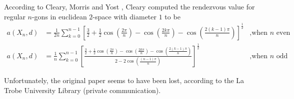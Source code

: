 
According to Cleary, Morris and Yost \cite{cleary:numbers-of-shapes}, Cleary computed the rendezvous value for regular $n$-gons in euclidean $2$-space with diameter $1$ to be 
	\begin{align*}
	a(X_n,d)&=\frac{1}{2n}\sum_{k=0}^{n-1}\left[\frac{3}{2}+\frac{1}{2}\cos\left(\frac{2\pi}{n}\right)-\cos\left(\frac{2k\pi}{n}\right)-\cos\left(\frac{2(k-1)\pi}{n}\right)\right]^{\frac{1}{2}}& \text{,when }n \text{ even}
	\\
	a(X_n,d)&=\frac{1}{n}\sum_{k=0}^{n-1}\left[\frac{\frac{3}{2}+\frac{1}{2}\cos\left(\frac{2\pi}{n}\right)-\cos\left(\frac{2k\pi}{n}\right)-\cos\left(\frac{2(k-1)\pi}{n}\right)}{2-2\cos\left(\frac{(n-1)\pi}{n}\right)}\right]^{\frac{1}{2}}& \text{,when }n \text{ odd}
	\end{align*}
	
Unfortunately, the original paper seems to have been lost, according to the La Trobe University Library (private communication).

